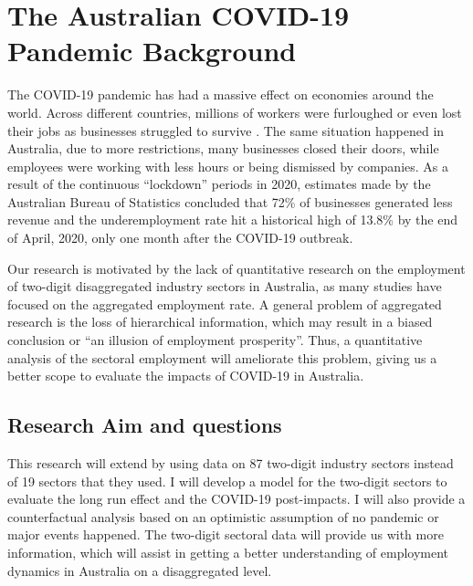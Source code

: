 \documentclass{monashthesis}
\begin{document}
\hypertarget{the-australian-covid-19-pandemic-background}{%
\chapter{The Australian COVID-19 Pandemic Background}\label{the-australian-covid-19-pandemic-background}}

The COVID-19 pandemic has had a massive effect on economies around the world. Across different countries, millions of workers were furloughed or even lost their jobs as businesses struggled to survive \autocite{ny2020}. The same situation happened in Australia, due to more restrictions, many businesses closed their doors, while employees were working with less hours or being dismissed by companies. As a result of the continuous ``lockdown'' periods in 2020, estimates made by the Australian Bureau of Statistics \autocite{ABS2021} concluded that 72\% of businesses generated less revenue and the underemployment rate hit a historical high of 13.8\% by the end of April, 2020, only one month after the COVID-19 outbreak.

Our research is motivated by the lack of quantitative research on the employment of two-digit disaggregated industry sectors in Australia, as many studies have focused on the aggregated employment rate. A general problem of aggregated research is the loss of hierarchical information, which may result in a biased conclusion or ``an illusion of employment prosperity''. Thus, a quantitative analysis of the sectoral employment will ameliorate this problem, giving us a better scope to evaluate the impacts of COVID-19 in Australia.

\hypertarget{research-aim-and-questions}{%
\section{Research Aim and questions}\label{research-aim-and-questions}}

This research will extend \textcite{anderson2020} by using data on 87 two-digit industry sectors instead of 19 sectors that they used. I will develop a model for the two-digit sectors to evaluate the long run effect and the COVID-19 post-impacts. I will also provide a counterfactual analysis based on an optimistic assumption of no pandemic or major events happened. The two-digit sectoral data will provide us with more information, which will assist in getting a better understanding of employment dynamics in Australia on a disaggregated level.
\end{document}
